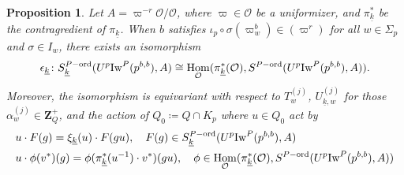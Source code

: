 \documentclass[leqno]{amsart}
\newcommand{\wt}[1]{\underline{ #1 }}
\newcommand{\Iw}{\textnormal{Iw}}
\newcommand{\ord}{\textnormal{ord}}
\newcommand{\Z}{{\mathbf{Z}}}
\newcommand{\oo}{\mathcal{O}} %
\DeclareMathOperator{\Hom}{Hom}
\newtheorem{prop}[thm]{Proposition}
\theoremstyle{definition}
\theoremstyle{remark}
\begin{document}
\begin{prop}
	Let $A=\varpi^{-r}\oo/\oo$,
	where $\varpi\in\oo$ be a uniformizer,
	and $\pi_{\wt{k}}^*$ be the contragredient of 
	$\pi_{\wt{k}}$.
	When $b$ satisfies
	$\iota_p\circ\sigma(\varpi_w^b)\in (\varpi^r)$
	for all  $w\in \Sigma_p$ and $\sigma\in I_w$,
	there exists an isomorphism
	\[
		\epsilon_{\wt{k}} \colon 
		S_{\wt{k}}^{P-\ord}(U^p\Iw^P(p^{b,b}),A)\cong 
		\Hom_{\oo}(\pi_{\wt{k}}^*(\oo),
		S^{P-\ord}(U^p\Iw^P(p^{b,b}),A)).
	\]
	Moreover, the isomorphism is 
	equivariant with respect to $T_w^{(j)}$,
	$U_{\wt{k},w}^{(j)}$
	for those $\alpha_w^{(j)}\in \Z_Q^+$,
	and the action of 
	$Q_0\coloneqq Q\cap K_p$
	where $u\in Q_0$ act by 
	\begin{align*}
	&u\cdot F(g)=\xi_{\wt{k}}(u)\cdot F(gu),\quad
	F(g)\in S_{\wt{k}}^{P-\ord}(U^p\Iw^P(p^{b,b}),A)\\
	&u\cdot \phi(v^*)(g)=
	\phi(\pi^*_{\wt{k}}(u^{-1})\cdot v^*)(gu),\quad
	\phi\in \Hom_{\oo}(\pi_{\wt{k}}^*(\oo),
	S^{P-\ord}(U^p\Iw^P(p^{b,b}),A))
	\end{align*}
\end{prop}
\end{document}
